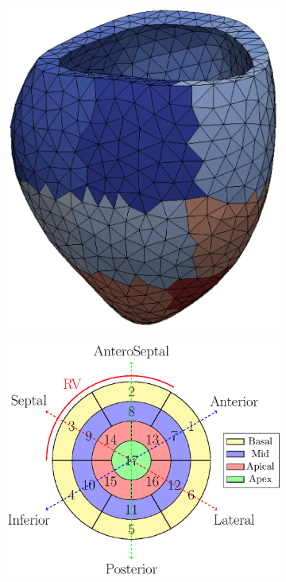 \begin{figure}[htbp]
\begin{subfigure}[t]{0.25\textwidth}
    \caption{\label{fig:compgeo_fibers}}
\end{subfigure}
\qquad
\begin{subfigure}[t]{0.25\textwidth}
    \includegraphics[width=\textwidth, trim={15cm 4cm 21cm 3cm}, clip]{sfun}
    \caption{\label{fig:compgeo_regions}}
\end{subfigure}
\begin{subfigure}[t]{0.35\textwidth}
    \includegraphics[width=\textwidth]{bullseye}

\end{subfigure}
\end{figure}
